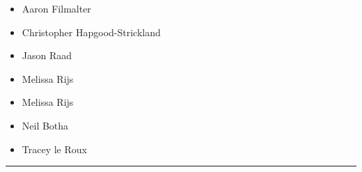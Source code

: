 \documentclass[10pt]{article}
\begin{document}
		

	\begin{multicols}{2}

		\begin{itemize}
									\item Aaron Filmalter
									\item Christopher Hapgood-Strickland
									\item Jason Raad
									\item Melissa Rijs
						\end{itemize}

		\vfill\null
		\columnbreak

		\begin{itemize}
									\item Melissa Rijs
									\item Neil Botha
									\item Tracey le Roux
						\end{itemize}

		\vfill\null

		\end{multicols}



			\vspace{0.5cm}
	\hrule
	\vspace{0.5cm}
\end{document}
